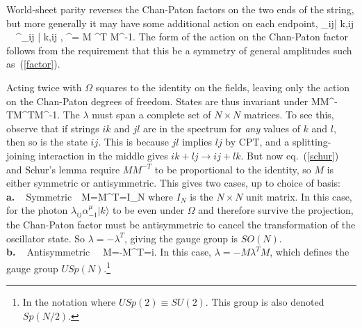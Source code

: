 World-sheet parity reverses the Chan-Paton factors on the two ends of the
string, but more generally it may have some additional action on each
endpoint,
\be
\Omega\lambda_{ij}|{ k},ij \rangle\ \to\
\lambda^\prime_{ij} |{ k},ij \rangle, \quad
\lambda^\prime= M \lambda^{T} M^{-1}.
\ee
The form of the action on the Chan-Paton factor follows from the requirement
that this be a symmetry of general amplitudes such as~(\ref{factor}).

Acting twice with $\Omega$ squares to the identity on the fields, leaving
only the action on the Chan-Paton degrees of freedom. States are thus
invariant under 
\be
\lambda\to MM^{-T}\lambda M^TM^{-1}. \label{schur}
\ee  
The $\lambda$ must span a complete set of $N \times N$ matrices.  To see
this, observe that if strings $ik$ and $jl$ are in the spectrum for {\it any}
values of $k$ and
$l$, then so is the state $ij$.  This is because $jl$ implies $lj$ by CPT, and
a splitting-joining interaction in the middle gives $ik + lj \to ij + lk$.
But now eq.~(\ref{schur}) and Schur's lemma require $MM^{-T}$ to be
proportional to the identity,
so $M$ is either symmetric or antisymmetric.
This gives
two cases, up to choice of basis:\,\cite{sms}
\be
{\bf a.\ \ }{\rm Symmetric\colon}\ \ M=M^T=I_N
\qquad\qquad\qquad\qquad\qquad
\ee 
where $I_N$ is the $N\times N$ unit matrix.  In this case, for the photon
$\lambda_{ij}\alpha^\mu_{-1}|{ k}\rangle$ to be even under $\Omega$ and
therefore survive the projection, the Chan-Paton factor must be antisymmetric
to cancel the transformation of the oscillator state.  So
$\lambda=-\lambda^T$, giving the gauge group is $SO(N)$.
\be
{\bf b.\ \ }{\rm Antisymmetric\colon}
\ \ M=-M^T=i\left[ \begin{array}{cc}
0&I_{N/2}\\ -I_{N/2}&0 \end{array}\right].
\ee
In this case, $\lambda=-M\lambda^TM$, which defines the gauge
group $USp(N)$.\footnote{In the notation where $USp(2)\equiv SU(2)$.  This
group is also denoted $Sp(N/2)$.}

